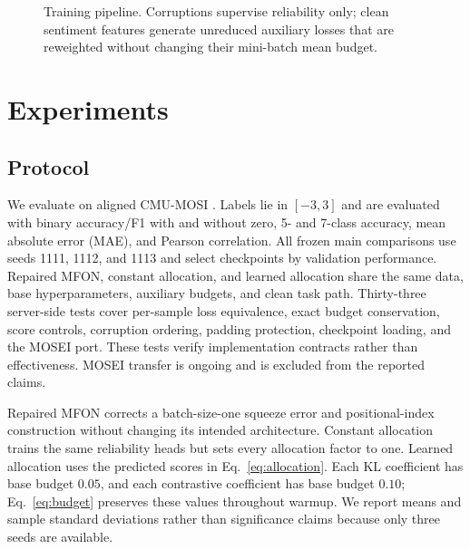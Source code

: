 \documentclass{article}
\begin{document}
\begin{figure}[t]
\centering
\small
\setlength{\tabcolsep}{5pt}
\caption{Training pipeline. Corruptions supervise reliability only; clean sentiment features generate unreduced auxiliary losses that are reweighted without changing their mini-batch mean budget.}
\label{fig:pipeline}
\end{figure}

\section{Experiments}
\label{sec:experiments}

\subsection{Protocol}

We evaluate on aligned CMU-MOSI \cite{zadeh2016multimodal}. Labels lie in $[-3,3]$ and are evaluated with binary accuracy/F1 with and without zero, 5- and 7-class accuracy, mean absolute error (MAE), and Pearson correlation. All frozen main comparisons use seeds 1111, 1112, and 1113 and select checkpoints by validation performance. Repaired MFON, constant allocation, and learned allocation share the same data, base hyperparameters, auxiliary budgets, and clean task path. Thirty-three server-side tests cover per-sample loss equivalence, exact budget conservation, score controls, corruption ordering, padding protection, checkpoint loading, and the MOSEI port. These tests verify implementation contracts rather than effectiveness. MOSEI transfer is ongoing and is excluded from the reported claims.

Repaired MFON corrects a batch-size-one squeeze error and positional-index construction without changing its intended architecture. Constant allocation trains the same reliability heads but sets every allocation factor to one. Learned allocation uses the predicted scores in Eq.~\eqref{eq:allocation}. Each KL coefficient has base budget $0.05$, and each contrastive coefficient has base budget $0.10$; Eq.~\eqref{eq:budget} preserves these values throughout warmup. We report means and sample standard deviations rather than significance claims because only three seeds are available.
\end{document}
